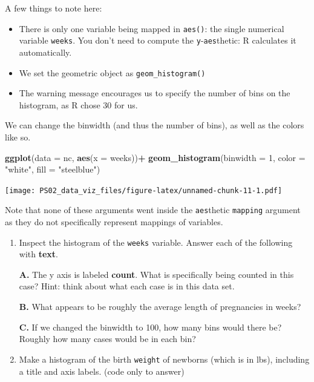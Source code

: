 \documentclass[]{article}
\newenvironment{Shaded}{\begin{snugshade}}{\end{snugshade}}
\newcommand{\DataTypeTok}[1]{\textcolor[rgb]{0.13,0.29,0.53}{#1}}
\newcommand{\DecValTok}[1]{\textcolor[rgb]{0.00,0.00,0.81}{#1}}
\newcommand{\KeywordTok}[1]{\textcolor[rgb]{0.13,0.29,0.53}{\textbf{#1}}}
\newcommand{\NormalTok}[1]{#1}
\newcommand{\OperatorTok}[1]{\textcolor[rgb]{0.81,0.36,0.00}{\textbf{#1}}}
\newcommand{\StringTok}[1]{\textcolor[rgb]{0.31,0.60,0.02}{#1}}
\providecommand{\tightlist}{%
  \setlength{\itemsep}{0pt}\setlength{\parskip}{0pt}}
\begin{document}
A few things to note here:

\begin{itemize}
\tightlist
\item
  There is only one variable being mapped in \texttt{aes()}: the single
  numerical variable \texttt{weeks}. You don't need to compute the
  \texttt{y}-\texttt{aes}thetic: R calculates it automatically.
\item
  We set the geometric object as \texttt{geom\_histogram()}
\item
  The warning message encourages us to specify the number of bins on the
  histogram, as R chose 30 for us.
\end{itemize}

We can change the binwidth (and thus the number of bins), as well as the
colors like so.

\begin{Shaded}
\begin{Highlighting}[]
\KeywordTok{ggplot}\NormalTok{(}\DataTypeTok{data =}\NormalTok{ nc, }\KeywordTok{aes}\NormalTok{(}\DataTypeTok{x =}\NormalTok{ weeks))}\OperatorTok{+}\StringTok{ }
\StringTok{  }\KeywordTok{geom_histogram}\NormalTok{(}\DataTypeTok{binwidth =} \DecValTok{1}\NormalTok{, }\DataTypeTok{color =} \StringTok{"white"}\NormalTok{, }\DataTypeTok{fill =} \StringTok{"steelblue"}\NormalTok{)}
\end{Highlighting}
\end{Shaded}

\texttt{[image: PS02\_data\_viz\_files/figure-latex/unnamed-chunk-11-1.pdf]}

Note that none of these arguments went inside the \texttt{aes}thetic
\texttt{mapping} argument as they do not specifically represent mappings
of variables.

\begin{enumerate}
\def\labelenumi{\arabic{enumi}.}
\item
  Inspect the histogram of the \texttt{weeks} variable. Answer each of
  the following with \textbf{text}.

  \textbf{A.} The y axis is labeled \textbf{count}. What is specifically
  being counted in this case? Hint: think about what each case is in
  this data set.

  \textbf{B.} What appears to be roughly the average length of
  pregnancies in weeks?

  \textbf{C.} If we changed the binwidth to 100, how many bins would
  there be? Roughly how many cases would be in each bin?
\item
  Make a histogram of the birth \texttt{weight} of newborns (which is in
  lbs), including a title and axis labels. (code only to answer)
\end{enumerate}
\end{document}
